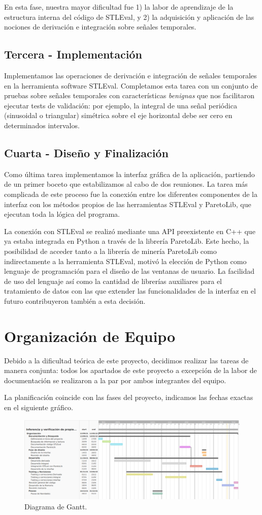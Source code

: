 	En esta fase, nuestra mayor dificultad fue 1) la labor de aprendizaje de la estructura interna del código de STLEval, y 2) la adquisición y aplicación de las nociones de derivación e integración sobre señales temporales.

\subsection{Tercera - Implementación}

	Implementamos las operaciones de derivación e integración de señales temporales en la herramienta software STLEval. Completamos esta tarea con un conjunto de pruebas sobre señales temporales con características \textit{benignas} que nos facilitaron ejecutar tests de validación: por ejemplo, la integral de una señal periódica (sinusoidal o triangular) simétrica sobre el eje horizontal debe ser cero en determinados intervalos.

\subsection{Cuarta - Diseño y Finalización}

	Como última tarea implementamos la interfaz gráfica de la aplicación, partiendo de un primer boceto que estabilizamos al cabo de dos reuniones. La tarea más complicada de este proceso fue la conexión entre los diferentes componentes de la interfaz con los métodos propios de las herramientas STLEval y ParetoLib, que ejecutan toda la lógica del programa.
	
	La conexión con STLEval se realizó mediante una API preexistente en C++ que ya estaba integrada en Python a través de la librería ParetoLib. Este hecho, la posibilidad de acceder tanto a la librería de minería ParetoLib como indirectamente a la herramienta STLEval, motivó la elección de Python como lenguaje de programación para el diseño de las ventanas de usuario. La facilidad de uso del lenguaje así como la cantidad de librerías auxiliares para el tratamiento de datos con las que extender las funcionalidades de la interfaz en el futuro contribuyeron también a esta decisión.
	


\section{Organización de Equipo}

Debido a la dificultad teórica de este proyecto, decidimos realizar las tareas de manera conjunta: todos los apartados de este proyecto a excepción de la labor de documentación se realizaron a la par por ambos integrantes del equipo. 

La planificación coincide con las fases del proyecto, indicamos las fechas exactas en el siguiente gráfico.

\begin{figure}
\centering
  \includegraphics[width=.9\linewidth ,angle = 90,scale = 1.2]{images/gant}
\caption{Diagrama de Gantt.}
\label{fig:gant}
\end{figure}

